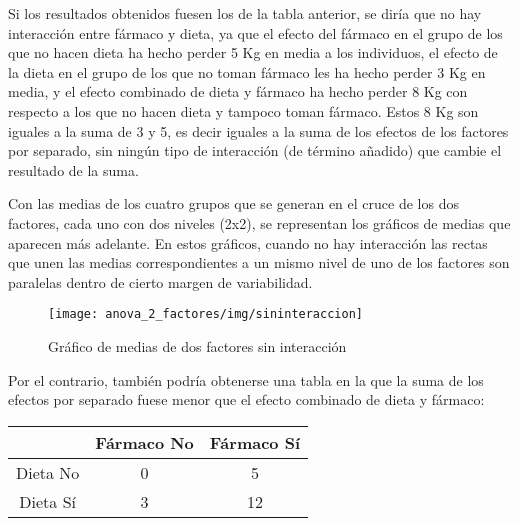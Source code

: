 Si los resultados obtenidos fuesen los de la tabla anterior, se diría que no hay interacción entre fármaco y dieta, ya que el efecto del
fármaco en el grupo de los que no hacen dieta ha hecho perder 5 Kg en media a los individuos, el efecto de la dieta en el grupo de los que
no toman fármaco les ha hecho perder 3 Kg en media, y el efecto combinado de dieta y fármaco ha hecho perder 8 Kg con respecto a los que no
hacen dieta y tampoco toman fármaco. Estos 8 Kg son iguales a la suma de 3 y 5, es decir iguales a la suma de los efectos de los factores
por separado, sin ningún tipo de interacción (de término añadido) que cambie el resultado de la suma.

Con las medias de los cuatro grupos que se generan en el cruce de los dos factores, cada uno con dos niveles (2x2), se representan los
gráficos de medias que aparecen más adelante. En estos gráficos, cuando no hay interacción las rectas que unen las medias correspondientes a
un mismo nivel de uno de los factores son paralelas dentro de cierto margen de variabilidad.

\begin{figure}[h!]
\begin{center}
\texttt{[image: anova\_2\_factores/img/sininteraccion]}
\caption{Gráfico de medias de dos factores sin interacción}
\end{center}
\end{figure}

Por el contrario, también podría obtenerse una tabla en la que la suma de los efectos por separado fuese menor que el efecto combinado de dieta y fármaco:

\begin{center}
\begin{tabular}{|l|l|l|}
\cline{2-3}
\multicolumn{1}{c|}{} & \multicolumn{1}{c|}{Fármaco No} & \multicolumn{1}{c|}{Fármaco Sí} \\
\hline
\multicolumn{1}{|c|}{Dieta No} & \multicolumn{1}{c|}{0} & \multicolumn{1}{c|}{5} \\
\hline
\multicolumn{1}{|c|}{Dieta Sí} & \multicolumn{1}{c|}{3} & \multicolumn{1}{c|}{12} \\
\hline
\end{tabular}
\end{center}

